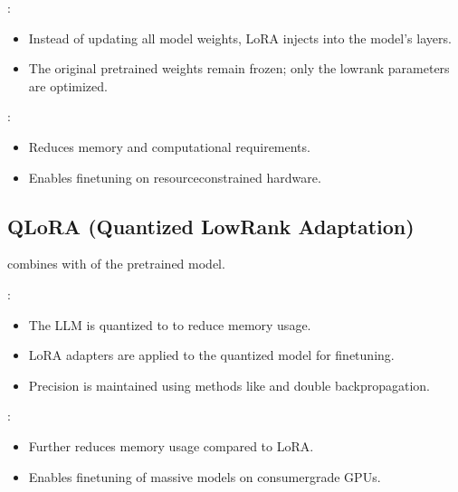 \documentclass[letterpaper,11pt,english]{sphinxmanual}
\begin{document}
\sphinxAtStartPar
{}:
\begin{itemize}
\item {} 
\sphinxAtStartPar
Instead of updating all model weights, LoRA injects  into the model’s layers.

\item {} 
\sphinxAtStartPar
The original pre\sphinxhyphen{}trained weights remain frozen; only the low\sphinxhyphen{}rank parameters are optimized.

\end{itemize}

\sphinxAtStartPar
{}:
\begin{itemize}
\item {} 
\sphinxAtStartPar
Reduces memory and computational requirements.

\item {} 
\sphinxAtStartPar
Enables fine\sphinxhyphen{}tuning on resource\sphinxhyphen{}constrained hardware.

\end{itemize}


\subsection{QLoRA (Quantized Low\sphinxhyphen{}Rank Adaptation)}
\label{\detokenize{finetuning:qlora-quantized-low-rank-adaptation}}
\sphinxAtStartPar
{} combines  with  of the pre\sphinxhyphen{}trained model.

\sphinxAtStartPar
{}:
\begin{itemize}
\item {} 
\sphinxAtStartPar
The LLM is quantized to  to reduce memory usage.

\item {} 
\sphinxAtStartPar
LoRA adapters are applied to the quantized model for fine\sphinxhyphen{}tuning.

\item {} 
\sphinxAtStartPar
Precision is maintained using methods like  and double backpropagation.

\end{itemize}

\sphinxAtStartPar
{}:
\begin{itemize}
\item {} 
\sphinxAtStartPar
Further reduces memory usage compared to LoRA.

\item {} 
\sphinxAtStartPar
Enables fine\sphinxhyphen{}tuning of massive models on consumer\sphinxhyphen{}grade GPUs.

\end{itemize}
\end{document}

